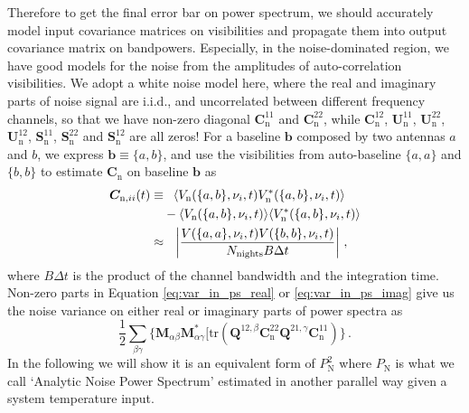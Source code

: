 \documentclass[12pt,a4paper]{article}
\begin{document}
Therefore to get the final error bar on power spectrum, we should accurately model input covariance matrices on visibilities and propagate them into output covariance matrix on bandpowers. Especially, in the noise-dominated region, we have good models for the noise from the amplitudes of auto-correlation visibilities. We adopt a white noise model here, where the real and imaginary parts of noise signal are i.i.d., and uncorrelated between different frequency channels, so that we have non-zero diagonal $\bm{C}_\text{n}^{11}$ and $\bm{C}_\text{n}^{22}$, while $\bm{C}_\text{n}^{12}$, $\bm{U}_\text{n}^{11}$, $\bm{U}_\text{n}^{22}$, $\bm{U}_\text{n}^{12}$, $\bm{S}_\text{n}^{11}$, $\bm{S}_\text{n}^{22}$ and $\bm{S}_\text{n}^{12}$ are all zeros! For a baseline $\bm{b}$ composed by two antennas $a$ and $b$, we express $\bm{b} \equiv \{a,b\}$, and use the visibilities from auto-baseline $\{a,a\}$ and $\{b,b\}$ to estimate $\bm{C}_\text{n}$ on baseline $\bm{b}$ as \citep{2015ApJ...801...51J}
\begin{align}
\label{eq:auto_vis_noise}
   \bm{C}_{\text{n},ii}(t) \equiv & \phantom{-} \langle V_\text{n}(\{a,b\},\nu_i,t) V_\text{n}^*(\{a,b\},\nu_i,t) \rangle \notag \\
   & - \langle V_\text{n}(\{a,b\},\nu_i,t) \rangle \langle V_\text{n}^*(\{a,b\},\nu_i,t) \rangle \notag \\
   \approx &  \phantom{-} \left|\frac{V(\{a,a\}, \nu_i,t)V(\{b,b\}, \nu_i,t)}{N_\text{nights} B \Delta t}\right| \,,
\end{align}
where $B\Delta t$ is the product of the channel bandwidth and the integration time. Non-zero parts in Equation \ref{eq:var_in_ps_real} or \ref{eq:var_in_ps_imag} give us the noise variance on either real or imaginary parts of power spectra as 
\begin{equation}
\label{eq:analytic_noise_variance}
\frac{1}{2} \sum_{\beta\gamma} 
    \Big\{\bm{M}_{\alpha\beta} \bm{M}_{\alpha\gamma}^* \big[\text{tr}(\bm{Q}^{12,\beta} \bm{C}_\text{n}^{22} \bm{Q}^{21,\gamma} \bm{C}_\text{n}^{11}) \Big\}\,.    
\end{equation}
In the following we will show it is an equivalent form of $P_\text{N}^2$ where $P_\text{N}$ is what we call `Analytic Noise Power Spectrum' estimated in another parallel way given a system temperature input.      
\end{document}
